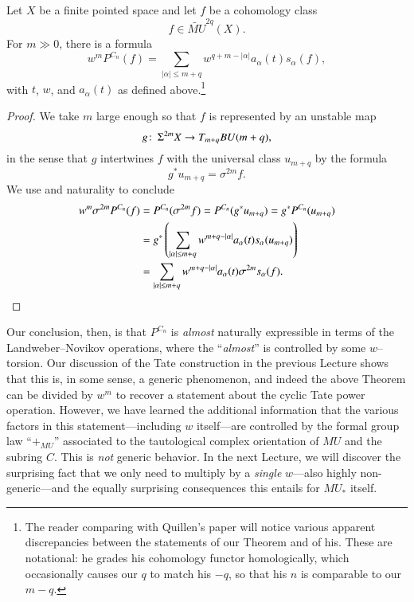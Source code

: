 \begin{theorem}\label{QuillensKeyRelation}
Let $X$ be a finite pointed space and let $f$ be a cohomology class \[f \in \widetilde{MU}^{2q}(X).\]  For $m \gg 0$, there is a formula \[w^m P^{C_n}(f) = \sum_{|\alpha| \le m+q} w^{q+m - |\alpha|} a_\alpha(t) s_\alpha(f),\] with $t$, $w$, and $a_\alpha(t)$ as defined above.\footnote{The reader comparing with Quillen's paper will notice various apparent discrepancies between the statements of our Theorem and of his.  These are notational: he grades his cohomology functor homologically, which occasionally causes our $q$ to match his $-q$, so that his $n$ is comparable to our $m-q$.}
\end{theorem}
\begin{proof}
We take $m$ large enough so that $f$ is represented by an unstable map \[g\colon\thinspace \Sigma^{2m} X \to T_{m+q} BU(m+q),\] in the sense that $g$ intertwines $f$ with the universal class $u_{m+q}$ by the formula \[g^* u_{m+q} = \sigma^{2m} f.\]  We use  and naturality to conclude
\begin{align*}
w^m \sigma^{2m} P^{C_n}(f) & = P^{C_n}(\sigma^{2m} f) = P^{C_n}(g^* u_{m+q}) = g^* P^{C_n}(u_{m+q}) \\
& = g^* \left(\sum_{|\alpha| \le m+q} w^{m+q - |\alpha|} a_\alpha(t) s_\alpha(u_{m+q}) \right) \\
& = \sum_{|\alpha| \le m+q} w^{m+q - |\alpha|} a_\alpha(t) \sigma^{2m} s_\alpha(f). \qedhere
\end{align*}
\end{proof}

Our conclusion, then, is that $P^{C_n}$ is \emph{almost} naturally expressible in terms of the Landweber--Novikov operations, where the ``\emph{almost}'' is controlled by some $w$--torsion.  Our discussion of the Tate construction in the previous Lecture shows that this is, in some sense, a generic phenomenon, and indeed the above Theorem can be divided by $w^m$ to recover a statement about the cyclic Tate power operation.  However, we have learned the additional information that the various factors in this statement---including $w$ itself---are controlled by the formal group law ``$+_{MU}$'' associated to the tautological complex orientation of $MU$ and the subring $C$.  This is \emph{not} generic behavior.  In the next Lecture, we will discover the surprising fact that we only need to multiply by a \emph{single} $w$---also highly non-generic---and the equally surprising consequences this entails for $MU_*$ itself.











